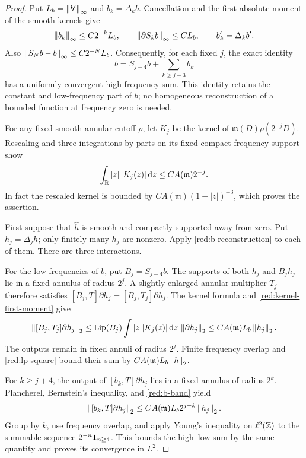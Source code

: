\begin{proof}
Put \(L_b=\left\|b'\right\|_\infty\) and \(b_k=\Delta_kb\).
Cancellation and the first absolute moment of the smooth kernels give
\begin{equation}\label{red:b-band}
 \left\|b_k\right\|_\infty\le C2^{-k}L_b,
 \qquad \left\|\partial S_kb\right\|_\infty\le C L_b,
 \qquad b_k'=\Delta_kb'.
\end{equation}
Also \(\left\|S_Nb-b\right\|_\infty\le C2^{-N}L_b\).
Consequently, for each fixed \(j\), the exact identity
\begin{equation}\label{red:b-reconstruction}
 b=S_{j-4}b+\sum_{k\ge j-3}b_k
\end{equation}
has a uniformly convergent high-frequency sum. This identity retains
the constant and low-frequency part of \(b\); no homogeneous
reconstruction of a bounded function at frequency zero is needed.

For any fixed smooth annular cutoff \(\rho\), let \(K_j\) be the
kernel of \(\mathfrak m(D)\rho(2^{-j}D)\). Rescaling and three
integrations by parts on its fixed compact frequency support show
\begin{equation}\label{red:kernel-first-moment}
 \int_\mathbb R |z|\,|K_j(z)|\,\mathrm d z
       \le C A(\mathfrak m)2^{-j}.
\end{equation}
In fact the rescaled kernel is bounded by
\(C A(\mathfrak m)(1+|z|)^{-3}\), which proves the assertion.

First suppose that \(\widehat h\) is smooth and compactly supported
away from zero. Put \(h_j=\Delta_jh\); only finitely many \(h_j\)
are nonzero. Apply \eqref{red:b-reconstruction} to each of them.
There are three interactions.

For the low frequencies of \(b\), put \(B_j=S_{j-4}b\).
The supports of both \(h_j\) and \(B_jh_j\) lie in a fixed
annulus of radius \(2^j\). A slightly enlarged annular multiplier
\(T_j\) therefore satisfies
\([B_j,T]\partial h_j=[B_j,T_j]\partial h_j\).
The kernel formula and \eqref{red:kernel-first-moment} give
\[
 \left\|[B_j,T_j]\partial h_j\right\|_2
 \le \operatorname{Lip}(B_j)\int |z||K_j(z)|\,\mathrm d z\,
             \left\|\partial h_j\right\|_2
 \le C A(\mathfrak m)L_b\left\|h_j\right\|_2.
\]
The outputs remain in fixed annuli of radius \(2^j\). Finite
frequency overlap and \eqref{red:lp-square} bound their sum by
\(C A(\mathfrak m)L_b\left\|h\right\|_2\).

For \(k\ge j+4\), the output of
\([b_k,T]\partial h_j\) lies in a fixed annulus of radius \(2^k\).
Plancherel, Bernstein's inequality, and \eqref{red:b-band} yield
\[
 \left\|[b_k,T]\partial h_j\right\|_2
       \le C A(\mathfrak m)L_b 2^{j-k}\left\|h_j\right\|_2.
\]
Group by \(k\), use frequency overlap, and apply Young's inequality
on \(\ell^2(\mathbb Z)\) to the summable sequence
\(2^{-n}\mathbf 1_{n\ge4}\). This bounds the high--low sum by the
same quantity and proves its convergence in \(L^2\).


\end{proof}
